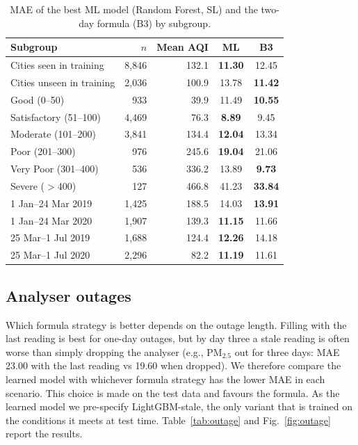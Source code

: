 \documentclass[conference]{IEEEtran}
\begin{document}
\begin{table}[t]
\centering
\caption{MAE of the best ML model (Random Forest, SL) and the two-day formula (B3) by subgroup.}
\label{tab:break}
\setlength{\tabcolsep}{4pt}
\begin{tabular}{@{}lrrcc@{}}
\toprule
Subgroup & $n$ & Mean AQI & ML & B3 \\
\midrule
Cities seen in training   & 8,846 & 132.1 & \textbf{11.30} & 12.45 \\
Cities unseen in training & 2,036 & 100.9 & 13.78 & \textbf{11.42} \\
\midrule
Good (0--50)            &   933 &  39.9 & 11.49 & \textbf{10.55} \\
Satisfactory (51--100)  & 4,469 &  76.3 & \textbf{8.89} & 9.45 \\
Moderate (101--200)     & 3,841 & 134.4 & \textbf{12.04} & 13.34 \\
Poor (201--300)         &   976 & 245.6 & \textbf{19.04} & 21.06 \\
Very Poor (301--400)    &   536 & 336.2 & 13.89 & \textbf{9.73} \\
Severe ($>$400)         &   127 & 466.8 & 41.23 & \textbf{33.84} \\
\midrule
1 Jan--24 Mar 2019      & 1,425 & 188.5 & 14.03 & \textbf{13.91} \\
1 Jan--24 Mar 2020      & 1,907 & 139.3 & \textbf{11.15} & 11.66 \\
25 Mar--1 Jul 2019      & 1,688 & 124.4 & \textbf{12.26} & 14.18 \\
25 Mar--1 Jul 2020      & 2,296 &  82.2 & \textbf{11.19} & 11.61 \\
\bottomrule
\end{tabular}
\end{table}

\subsection{Analyser outages}\label{sec:outage}
Which formula strategy is better depends on the outage length. Filling with the last reading
is best for one-day outages, but by day three a stale reading is often worse than simply
dropping the analyser (e.g., PM$_{2.5}$ out for three days: MAE 23.00 with the last reading vs
19.60 when dropped). We therefore compare the learned model with whichever formula strategy
has the lower MAE in each scenario. This choice is made on the test data and favours the
formula. As the learned model we pre-specify LightGBM-stale, the only variant that is trained
on the conditions it meets at test time. Table~\ref{tab:outage} and Fig.~\ref{fig:outage}
report the results.
\end{document}
